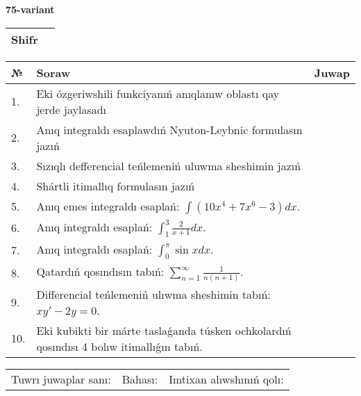 \documentclass{article}
\begin{document}
  \egroup
  
  \newpage
  
  
  \textbf{75-variant}\\
  
  \bgroup
  \def\arraystretch{1.6} %
  
  \begin{tabular}{|m{5.7cm}|m{9.5cm}|}
  \hline
  Shifr & \\
  \hline
  \end{tabular}
  
  \vspace{1cm}
  
  \begin{tabular}{|m{0.7cm}|m{10cm}|m{4cm}|}
  \hline
  № & Soraw & Juwap \\
  \hline
  1. & Eki ózgeriwshili funkciyanıń anıqlanıw oblastı qay jerde jaylasadı &  \\
  \hline
  2. & Anıq integraldı esaplawdıń Nyuton-Leybnic formulasın jazıń &  \\
  \hline
  3. & Sızıqlı defferencial teńlemeniń uluwma sheshimin jazıń &  \\
  \hline
  4. & Shártli itimallıq formulasın jazıń &  \\
  \hline
  5. & Anıq emes integraldı esaplań: \(\int{\left( 10x^{4} + 7x^{6} - 3 \right)dx}\). &  \\
  \hline
  6. & Anıq integraldı esaplań: \(\int_{1}^{3}\frac{2}{x + 1}dx\). &  \\
  \hline
  7. & Anıq integraldı esaplań: \(\int_{0}^{\pi}{\sin xdx}\). &  \\
  \hline
  8. & Qatardıń qosındısın tabıń: \(\sum_{n = 1}^{\infty}\frac{1}{n(n + 1)}\). &  \\
  \hline
  9. & Differencial teńlemeniń ulıwma sheshimin tabıń: \(xy' - 2y = 0\). &  \\
  \hline
  10. & Eki kubikti bir márte taslaǵanda túsken ochkolardıń qosındısı 4 bolıw itimallıǵın tabıń. &  \\
  \hline
  \end{tabular}
  
  \vspace{1cm}
  
  \begin{tabular}{lll}
  Tuwrı juwaplar sanı: \underline{\hspace{1.5cm}} & 
  Bahası: \underline{\hspace{1.5cm}} & 
  Imtixan alıwshınıń qolı: \underline{\hspace{2cm}} \\
  \end{tabular}
  
\end{document}
